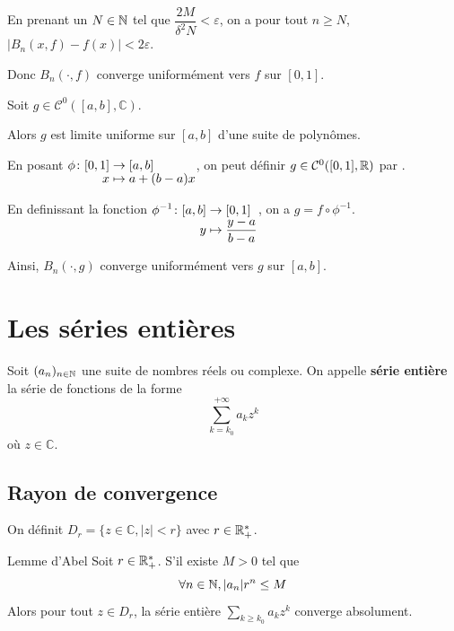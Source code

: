 \documentclass[a4paper,12pt]{article}
\begin{document}
\begin{demonstration}
    En prenant un $N \in \mathbb{N}$ tel que $\dfrac{2M}{\delta^2 N} < \varepsilon$, on a pour tout $n \geq N$, $|B_n(x, f) - f(x)| < 2\varepsilon$.

    Donc $B_n(\cdot, f)$ converge uniformément vers $f$ sur $[0, 1]$.
\end{demonstration}

\begin{corollaire}{}{}
    Soit $g \in \mathcal{C}^0([a, b], \mathbb{C})$.

    Alors $g$ est limite uniforme sur $[a, b]$ d'une suite de polynômes.
\end{corollaire}

\begin{demonstration}
    En posant $\funcdef{\phi}{[0, 1]}{[a, b]}{x}{a + (b - a)x}$, on peut définir $g \in \mathcal{C}^0([0, 1], \mathbb{R})$ par .

    En definissant la fonction $\funcdef{\phi^{-1}}{[a, b]}{[0, 1]}{y}{\frac{y - a}{b - a}}$, on a $g = f \circ \phi^{-1}$.

    Ainsi, $B_n(\cdot, g)$ converge uniformément vers $g$ sur $[a, b]$.
\end{demonstration}

\clearpage

\section{Les séries entières}

\begin{definition}
    Soit $(a_n)_{n \in \mathbb{N}}$ une suite de nombres réels ou complexe.
    On appelle \textbf{série entière} la série de fonctions de la forme
    $$
        \sum_{k = k_0}^{+\infty} a_k z^k
    $$
    où $z \in \mathbb{C}$.
\end{definition}

\clearpage

\subsection{Rayon de convergence}

\begin{definition}
    On définit $D_r = \{z \in \mathbb{C}, |z| < r\}$ avec $r \in \mathbb{R}_+^*$.
\end{definition}

\begin{lemme}{Lemme d'Abel}{}
    Soit $r \in \mathbb{R}_+^*$.
    S'il existe $M > 0$ tel que
    $$
    \forall n \in \mathbb{N}, |a_n| r^n \leq M
    $$
    Alors pour tout $z \in D_r$, la série entière $\sum\limits_{k \geq k_0} a_k z^k$ converge absolument.
\end{lemme}
\end{document}
